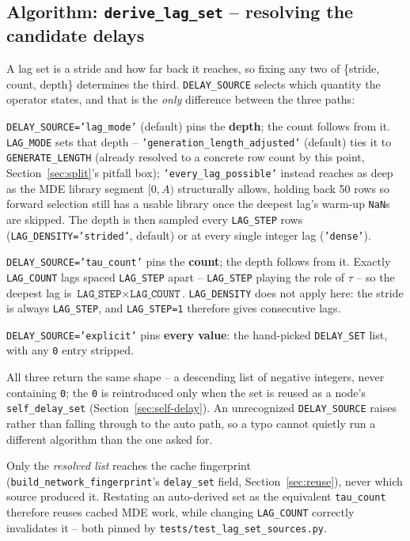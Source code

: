 \documentclass[11pt]{article}
\begin{document}
\subsection{Algorithm: \texttt{derive\_lag\_set} -- resolving the candidate delays}
\label{sec:lag-set}
A lag set is a stride and how far back it reaches, so fixing any two of \{stride, count, depth\} determines the third. \texttt{DELAY\_SOURCE} selects which quantity the operator states, and that is the \emph{only} difference between the three paths:
\begin{steps}
\item \texttt{DELAY\_SOURCE='lag\_mode'} (default) pins the \textbf{depth}; the count follows from it. \texttt{LAG\_MODE} sets that depth -- \texttt{'generation\_length\_adjusted'} (default) ties it to \texttt{GENERATE\_LENGTH} (already resolved to a concrete row count by this point, Section~\ref{sec:split}'s pitfall box); \texttt{'every\_lag\_possible'} instead reaches as deep as the MDE library segment $[0,A)$ structurally allows, holding back 50 rows so forward selection still has a usable library once the deepest lag's warm-up \texttt{NaN}s are skipped. The depth is then sampled every \texttt{LAG\_STEP} rows (\texttt{LAG\_DENSITY='strided'}, default) or at every single integer lag (\texttt{'dense'}).
\item \texttt{DELAY\_SOURCE='tau\_count'} pins the \textbf{count}; the depth follows from it. Exactly \texttt{LAG\_COUNT} lags spaced \texttt{LAG\_STEP} apart -- \texttt{LAG\_STEP} playing the role of $\tau$ -- so the deepest lag is $\texttt{LAG\_STEP} \times \texttt{LAG\_COUNT}$. \texttt{LAG\_DENSITY} does not apply here: the stride is always \texttt{LAG\_STEP}, and \texttt{LAG\_STEP=1} therefore gives consecutive lags.
\item \texttt{DELAY\_SOURCE='explicit'} pins \textbf{every value}: the hand-picked \texttt{DELAY\_SET} list, with any \texttt{0} entry stripped.
\end{steps}
All three return the same shape -- a descending list of negative integers, never containing \texttt{0}; the \texttt{0} is reintroduced only when the set is reused as a node's \texttt{self\_delay\_set} (Section~\ref{sec:self-delay}). An unrecognized \texttt{DELAY\_SOURCE} raises rather than falling through to the auto path, so a typo cannot quietly run a different algorithm than the one asked for.

Only the \emph{resolved list} reaches the cache fingerprint (\texttt{build\_network\_fingerprint}'s \texttt{delay\_set} field, Section~\ref{sec:reuse}), never which source produced it. Restating an auto-derived set as the equivalent \texttt{tau\_count} therefore reuses cached MDE work, while changing \texttt{LAG\_COUNT} correctly invalidates it -- both pinned by \texttt{tests/test\_lag\_set\_sources.py}.
\end{document}
